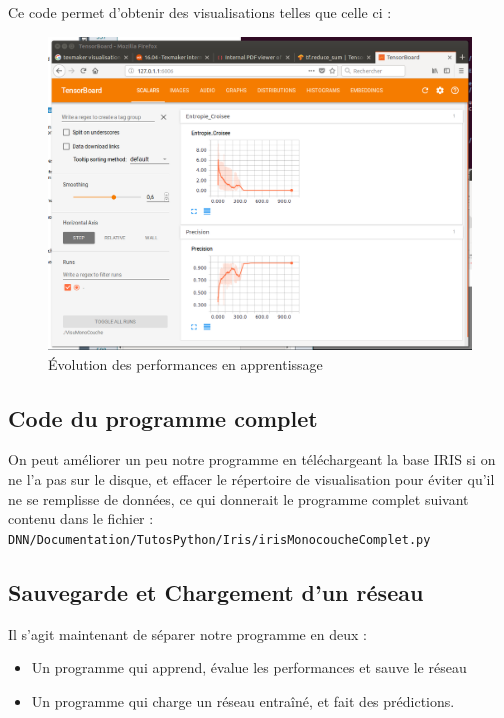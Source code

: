 \documentclass[a4paper,11pt]{book}
\begin{document}
Ce code permet d'obtenir des visualisations telles que celle ci :
\begin{figure}[H]
\begin{center}
\includegraphics[width=12cm]{./figures/scalarIrisMono.png} 
\end{center}
\caption{Évolution des performances en apprentissage}
\end{figure}

\subsection{Code du programme complet}
On peut améliorer un peu notre programme en téléchargeant la base IRIS si on ne l'a pas sur le disque, et effacer le répertoire de visualisation pour éviter qu'il ne se remplisse de données, ce qui donnerait le programme complet suivant contenu dans le fichier :\\
\verb+DNN/Documentation/TutosPython/Iris/irisMonocoucheComplet.py+



\subsection{Sauvegarde et Chargement d'un réseau }
\label{sec:irisMonocoucheSave}
Il s'agit maintenant de séparer notre programme en deux :
\begin{itemize}
\item Un programme qui apprend, évalue les performances et sauve le réseau
\item Un programme qui charge un réseau entraîné, et fait des prédictions.
\end{itemize}
\end{document}
